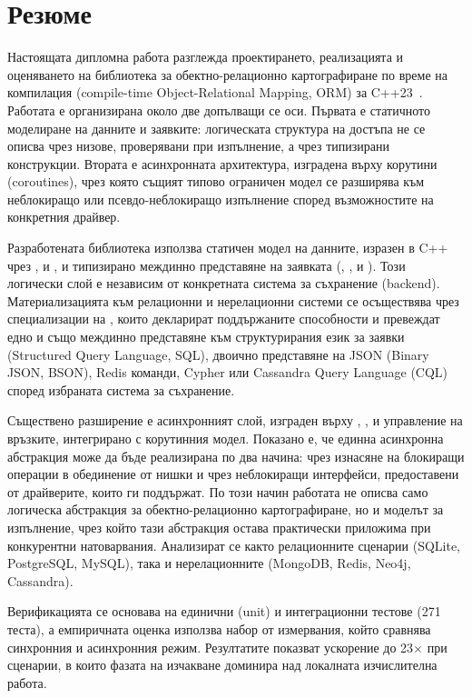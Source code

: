 \section*{Резюме}

Настоящата дипломна работа разглежда проектирането, реализацията и оценяването на библиотека за обектно-релационно картографиране по време на компилация (compile-time Object-Relational Mapping, ORM) за C++23~\cite{cpp23standard}. Работата е организирана около две допълващи се оси. Първата е статичното моделиране на данните и заявките: логическата структура на достъпа не се описва чрез низове, проверявани при изпълнение, а чрез типизирани  конструкции. Втората е асинхронната архитектура, изградена върху корутини (coroutines), чрез която същият типово ограничен модел се разширява към неблокиращо или псевдо-неблокиращо изпълнение според възможностите на конкретния драйвер.

Разработената библиотека използва статичен модел на данните, изразен в C++ чрез ,  и , и типизирано междинно представяне на заявката (, ,  и ). Този логически слой е независим от конкретната система за съхранение (backend). Материализацията към релационни и нерелационни системи се осъществява чрез специализации на , които декларират поддържаните способности и превеждат едно и също междинно представяне към структурирания език за заявки (Structured Query Language, SQL), двоично представяне на JSON (Binary JSON, BSON), Redis команди, Cypher или Cassandra Query Language (CQL) според избраната система за съхранение.

Съществено разширение е асинхронният слой, изграден върху , ,  и управление на връзките, интегрирано с корутинния модел. Показано е, че единна асинхронна абстракция може да бъде реализирана по два начина: чрез изнасяне на блокиращи операции в обединение от нишки и чрез неблокиращи интерфейси, предоставени от драйверите, които ги поддържат. По този начин работата не описва само логическа абстракция за обектно-релационно картографиране, но и моделът за изпълнение, чрез който тази абстракция остава практически приложима при конкурентни натоварвания. Анализират се както релационните сценарии (SQLite, PostgreSQL, MySQL), така и нерелационните (MongoDB, Redis, Neo4j, Cassandra).

Верификацията се основава на единични (unit) и интеграционни тестове (271 теста), а емпиричната оценка използва набор от измервания, който сравнява синхронния и асинхронния режим. Резултатите показват ускорение до 23$\times$ при сценарии, в които фазата на изчакване доминира над локалната изчислителна работа.

